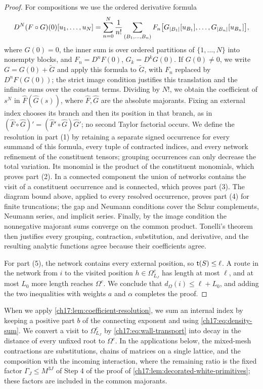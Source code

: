 \begin{proof}
For compositions we use the ordered derivative formula
\[
 D^N(F\circ G)(0)[u_1,\ldots,u_N]=\sum_{n=0}^N\frac1{n!}\sum_{(B_1,\ldots,B_n)}F_n\bigl[G_{\lvert B_1\rvert}[u_{B_1}],\ldots,G_{\lvert B_n\rvert}[u_{B_n}]\bigr],
\]
where $G(0)=0$, the inner sum is over ordered partitions of $\{1,\ldots,N\}$ into nonempty blocks, and $F_n=D^nF(0)$, $G_k=D^kG(0)$. If $G(0)\ne0$, we write $G=G(0)+\widetilde G$ and apply this formula to $\widetilde G$, with $F_n$ replaced by $D^nF(G(0))$; the strict image condition justifies this translation and the infinite sums over the constant terms. Dividing by $N!$, we obtain the coefficient of $s^N$ in $\widehat F(\widehat G(s))$, where $\widehat F,\widehat G$ are the absolute majorants. Fixing an external index chooses its branch and then its position in that branch, as in $(\widehat F\circ\widehat G)'=(\widehat F'\circ\widehat G)\widehat G'$; no second Taylor factorial occurs. We define the resolution in part (1) by retaining a separate signed occurrence for every summand of this formula, every tuple of contracted indices, and every network refinement of the constituent tensors; grouping occurrences can only decrease the total variation. Its monomial is the product of the constituent monomials, which proves part (2). In a connected component the union of networks contains the visit of a constituent occurrence and is connected, which proves part (3). The diagram bound above, applied to every resolved occurrence, proves part (4) for finite truncations; the gap and Neumann conditions cover the Schur complements, Neumann series, and implicit series. Finally, by the image condition the nonnegative majorant sums converge on the common product. Tonelli's theorem then justifies every grouping, contraction, substitution, and derivative, and the resulting analytic functions agree because their coefficients agree.

For part (5), the network contains every external position, so $\mathsf t(S)\le\ell$. A route in the network from $i$ to the visited position $h\in \Omega^c_{L_J}$ has length at most $\ell$, and at most $L_0$ more length reaches $\Omega^c$. We conclude that $d_\Omega(i)\le\ell+L_0$, and adding the two inequalities with weights $a$ and $\alpha$ completes the proof.
\end{proof}

When we apply \cref{ch17:lem:coefficient-resolution}, we sum an internal index by keeping a positive part $b$ of the connecting exponent and using \eqref{ch17:eq:density-sum}. We convert a visit to $\Omega^c_{L_J}$ by \eqref{ch17:eq:wall-transport} into decay in the distance of every unfixed root to $\Omega^c$. In the applications below, the mixed-mesh contractions are substitutions, chains of matrices on a single lattice, and the composition with the incoming interaction, where the remaining ratio is the fixed factor $\Gamma_J\le M^{3J}$ of Step 4 of the proof of \cref{ch17:lem:decorated-white-primitives}; these factors are included in the common majorants.

